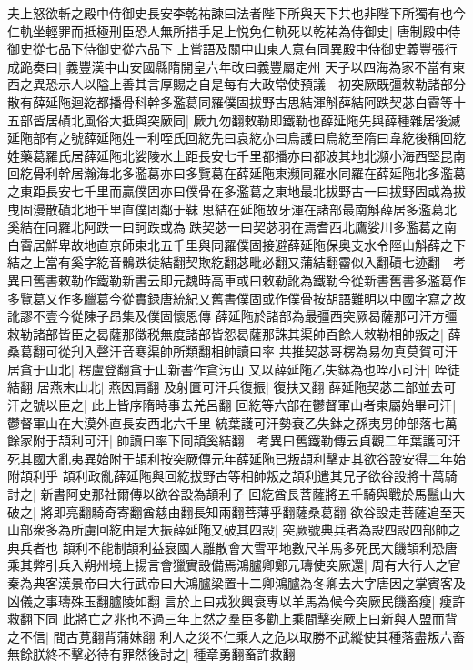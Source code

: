 夫上怒欲斬之殿中侍御史長安李乾祐諫曰法者陛下所與天下共也非陛下所獨有也今仁軌坐輕罪而抵極刑臣恐人無所措手足上悦免仁軌死以乾祐為侍御史|{
	唐制殿中侍御史從七品下侍御史從六品下}
上嘗語及關中山東人意有同異殿中侍御史義豐張行成跪奏曰|{
	義豐漢中山安國縣隋開皇六年改曰義豐屬定州}
天子以四海為家不當有東西之異恐示人以隘上善其言厚賜之自是每有大政常使預議　初突厥既彊敕勒諸部分散有薛延陁迴紇都播骨科幹多濫葛同羅僕固拔野古思結渾斛薛結阿跌契苾白霫等十五部皆居磧北風俗大抵與突厥同|{
	厥九勿翻敕勒即鐵勒也薛延陁先與薛種雜居後滅延陁部有之號薛延陁姓一利咥氏回紇先曰袁紇亦曰烏護曰烏紇至隋曰韋紇後稱回紇姓藥葛羅氏居薛延陁北娑陵水上距長安七千里都播亦曰都波其地北瀕小海西堅昆南回紇骨利幹居瀚海北多濫葛亦曰多覽葛在薛延陁東瀕同羅水同羅在薛延陁北多濫葛之東距長安七千里而贏僕固亦曰僕骨在多濫葛之東地最北拔野古一曰拔野固或為拔曳固漫散磧北地千里直僕固鄰于靺思結在延陁故牙渾在諸部最南斛薛居多濫葛北奚結在同羅北阿跌一曰訶跌或為跌契苾一曰契苾羽在焉耆西北鷹娑川多濫葛之南白霫居鮮卑故地直京師東北五千里與同羅僕固接避薛延陁保奥支水令陘山斛薛之下結之上當有奚字紇音鶻跌徒結翻契欺紇翻苾毗必翻又蒲結翻霤似入翻磧七迹翻　考異曰舊書敕勒作鐵勒新書云即元魏時高車或曰敕勒訛為鐵勒今從新書舊書多濫葛作多覽葛又作多臘葛今從實録唐統紀又舊書僕固或作僕骨按胡語難明以中國字寫之故訛謬不壹今從陳子昂集及僕固懷恩傳}
薛延陁於諸部為最彊西突厥曷薩那可汗方彊敕勒諸部皆臣之曷薩那徵税無度諸部皆怨曷薩那誅其渠帥百餘人敕勒相帥叛之|{
	薛桑葛翻可從刋入聲汗音寒渠帥所類翻相帥讀曰率}
共推契苾哥楞為易勿真莫賀可汗居貪于山北|{
	楞盧登翻貪于山新書作貪汚山}
又以薛延陁乙失鉢為也咥小可汗|{
	咥徒結翻}
居燕末山北|{
	燕因肩翻}
及射匱可汗兵復振|{
	復扶又翻}
薛延陁契苾二部並去可汗之號以臣之|{
	此上皆序隋時事去羌呂翻}
回紇等六部在鬱督軍山者東屬始畢可汗|{
	鬱督軍山在大漠外直長安西北六千里}
統葉護可汗勢衰乙失鉢之孫夷男帥部落七萬餘家附于頡利可汗|{
	帥讀曰率下同頡奚結翻　考異曰舊鐵勒傳云貞觀二年葉護可汗死其國大亂夷異始附于頡利按突厥傳元年薛延陁已叛頡利擊走其欲谷設安得二年始附頡利乎}
頡利政亂薛延陁與回紇拔野古等相帥叛之頡利遣其兄子欲谷設將十萬騎討之|{
	新書阿史那社爾傳以欲谷設為頡利子}
回紇酋長菩薩將五千騎與戰於馬鬛山大破之|{
	將即亮翻騎奇寄翻酋慈由翻長知兩翻菩薄乎翻薩桑葛翻}
欲谷設走菩薩追至天山部衆多為所虜回紇由是大振薛延陁又破其四設|{
	突厥號典兵者為設四設四部帥之典兵者也}
頡利不能制頡利益衰國人離散會大雪平地數尺羊馬多死民大饑頡利恐唐乘其弊引兵入朔州境上揚言會獵實設備焉鴻臚卿鄭元璹使突厥還|{
	周有大行人之官秦為典客漢景帝曰大行武帝曰大鴻臚梁置十二卿鴻臚為冬卿去大字唐因之掌賓客及凶儀之事璹殊玉翻臚陵如翻}
言於上曰戎狄興衰專以羊馬為候今突厥民饑畜瘦|{
	瘦許救翻下同}
此將亡之兆也不過三年上然之羣臣多勸上乘間擊突厥上曰新與人盟而背之不信|{
	間古莧翻背蒲妹翻}
利人之災不仁乘人之危以取勝不武縱使其種落盡叛六畜無餘朕終不擊必待有罪然後討之|{
	種章勇翻畜許救翻}
